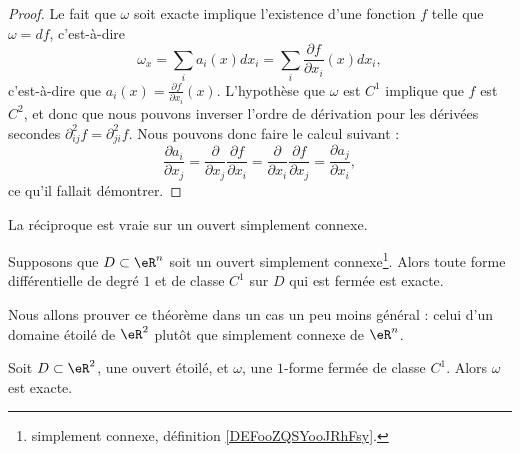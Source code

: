 \begin{proof}
	Le fait que \( \omega\) soit exacte implique l'existence d'une fonction \( f\) telle que \( \omega=df\), c'est-à-dire
	\begin{equation}
		\omega_x=\sum_i a_i(x)dx_i=\sum_i\frac{ \partial f }{ \partial x_i }(x)dx_i,
	\end{equation}
	c'est-à-dire que \( a_i(x)=\frac{ \partial f }{ \partial x_i }(x)\). L'hypothèse que \( \omega\) est \( C^1\) implique que \( f\) est \( C^2\), et donc que nous pouvons inverser l'ordre de dérivation pour les dérivées secondes \( \partial^2_{ij}f=\partial^2_{ji}f\). Nous pouvons donc faire le calcul suivant :
	\begin{equation}
		\frac{ \partial a_i }{ \partial x_j }=\frac{ \partial  }{ \partial x_j }\frac{ \partial f }{ \partial x_i }=\frac{ \partial  }{ \partial x_i }\frac{ \partial f }{ \partial x_j }=\frac{ \partial a_j }{ \partial x_i },
	\end{equation}
	ce qu'il fallait démontrer.
\end{proof}

La réciproque est vraie sur un ouvert simplement connexe.
\begin{theorem}        \label{ThoFermeExactFormRappel}
	Supposons que \( D\subset\eR^n\) soit un ouvert simplement connexe\footnote{simplement connexe, définition \ref{DEFooZQSYooJRhFsy}.}. Alors toute forme différentielle de degré \( 1\) et de classe \( C^1\) sur \( D\) qui est fermée est exacte.
\end{theorem}

Nous allons prouver ce théorème dans un cas un peu moins général : celui d'un domaine étoilé de \( \eR^2\) plutôt que simplement connexe de \( \eR^n\).

\begin{theorem} \label{ThoMSofFxL}
	Soit \( D\subset\eR^2\), une ouvert étoilé, et \( \omega\), une \( 1\)-forme fermée de classe \( C^1\). Alors \( \omega\) est exacte.
\end{theorem}


